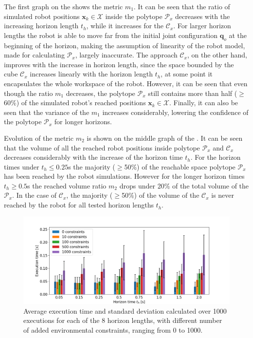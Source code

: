 The first graph on the  shows the metric $m_1$. It can be seen that the ratio of simulated robot positions $\bm{x}_k \in \mathcal{X}$ inside the polytope $\mathcal{P}_x$ decreases with the increasing horizon length $t_h$, while it increases for the $\mathcal{C}_x$. For larger horizon lengths the robot is able to move far from the initial joint configuration $\bm{q}_o$ at the beginning of the horizon, making the assumption of linearity of the robot model, made for calculating $\mathcal{P}_x$, largely inaccurate. The approach $\mathcal{C}_x$, on the other hand, improves with the increase in horizon length, since the space bounded by the cube $\mathcal{C}_x$ increases linearly with the horizon length $t_h$, at some point it encapsulates the whole workspace of the robot. However, it can be seen that even though the ratio $m_1$ decreases, the polytope $\mathcal{P}_x$ still contains more than half ($\geq$60\%) of the simulated robot's reached positions $\bm{x}_k\in\mathcal{X}$. Finally, it can also be seen that the variance of the $m_1$ increases considerably, lowering the confidence of the polytope $\mathcal{P}_x$ for longer horizons.

Evolution of the metric $m_2$ is shown on the middle graph of the  . It can be seen that the volume of all the reached robot positions inside polytope $\mathcal{P}_x$ and $\mathcal{C}_x$ decreases considerably with the increase of the horizon time $t_h$. For the horizon times under $t_h\leq 0.25$s the majority ($\geq$50\%) of the reachable space polytope $\mathcal{P}_x$ has been reached by the robot simulations. However for the longer horizon times $t_h\geq0.5$s the reached volume ratio $m_2$ drops under 20\% of the total volume of the $\mathcal{P}_x$. In the case of $\mathcal{C}_x$, the majority ($\geq$50\%)  of the volume of the $\mathcal{C}_x$ is never reached by the robot for all tested horizon lengths $t_h$. 

\begin{figure}[!t]
    \centering
    \includegraphics[width=\linewidth]{Papers/images/time_constriant.png}
    \caption{Average execution time and standard deviation calculated over 1000 executions for each of the 8 horizon lengths, with different number of added environmental constraints, ranging from 0 to 1000.}
    \label{fig:exec_time_constraints}
    
\end{figure}

